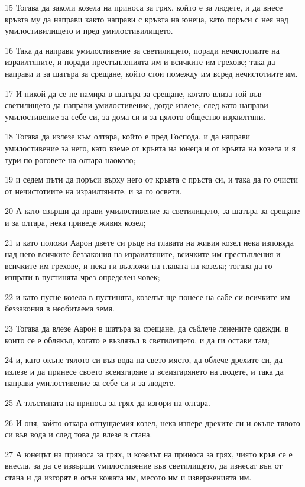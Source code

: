 \par 15 Тогава да заколи козела на приноса за грях, който е за людете, и да внесе кръвта му да направи както направи с кръвта на юнеца, като поръси с нея над умилостивилището и пред умилостивилището.
\par 16 Така да направи умилостивение за светилището, поради нечистотиите на израилтяните, и поради престъпленията им и всичките им грехове; така да направи и за шатъра за срещане, който стои помежду им всред нечистотиите им.
\par 17 И никой да се не намира в шатъра за срещане, когато влиза той във светилището да направи умилостивение, догде излезе, след като направи умилостивение за себе си, за дома си и за цялото общество израилтяни.
\par 18 Тогава да излезе към олтара, който е пред Господа, и да направи умилостивение за него, като вземе от кръвта на юнеца и от кръвта на козела и я тури по роговете на олтара наоколо;
\par 19 и седем пъти да поръси върху него от кръвта с пръста си, и така да го очисти от нечистотиите на израилтяните, и за го освети.
\par 20 А като свърши да прави умилостивение за светилището, за шатъра за срещане и за олтара, нека приведе живия козел;
\par 21 и като положи Аарон двете си ръце на главата на живия козел нека изповяда над него всичките беззакония на израилтяните, всичките им престъпления и всичките им грехове, и нека ги възложи на главата на козела; тогава да го изпрати в пустинята чрез определен човек;
\par 22 и като пусне козела в пустинята, козелът ще понесе на сабе си всичките им беззакония в необитаема земя.
\par 23 Тогава да влезе Аарон в шатъра за срещане, да съблече ленените одежди, в които се е облякъл, когато е възлязъл в светилището, и да ги остави там;
\par 24 и, като окъпе тялото си във вода на свето място, да облече дрехите си, да излезе и да принесе своето всеизгаряне и всеизгарянето на людете, и така да направи умилостивение за себе си и за людете.
\par 25 А тлъстината на приноса за грях да изгори на олтара.
\par 26 И оня, който откара отпущаемия козел, нека изпере дрехите си и окъпе тялото си във вода и след това да влезе в стана.
\par 27 А юнецът на приноса за грях, и козелът на приноса за грях, чиято кръв се е внесла, за да се извърши умилостивение във светилището, да изнесат вън от стана и да изгорят в огън кожата им, месото им и изверженията им.
